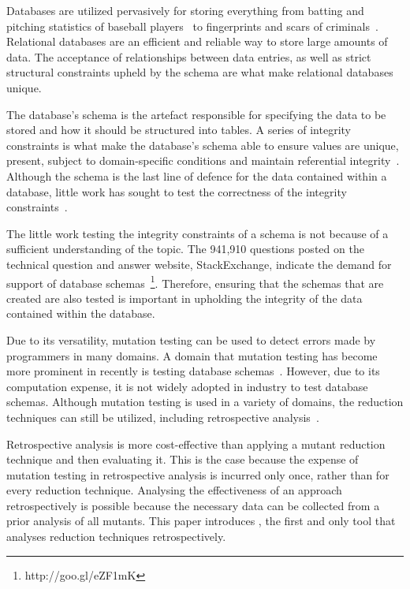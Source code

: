 Databases are utilized pervasively for storing everything from batting and pitching statistics of baseball
players~\cite{lahmanbaseball} to fingerprints and scars of criminals~\cite{ngi}.
Relational databases are an efficient and reliable way to store large amounts of data.
The acceptance of relationships between data entries, as well as strict structural constraints
upheld by the schema are what make relational databases unique.

The database's schema is the artefact responsible for specifying the data to be stored and
how it should be structured into tables. A series of integrity constraints
is what make the database's schema able to ensure values are unique, present,
subject to domain-specific conditions and maintain referential integrity~\cite{mcminn2016virtual}.
Although the schema is the last line of defence for the data contained
within a database, little work has sought to test the correctness of the integrity constraints~\cite{mcminn2015effectiveness}.




The little work testing the integrity constraints of a schema is not
because of a sufficient understanding of the topic. The 941,910 questions posted on
the technical question and answer website, StackExchange, indicate the demand for support
of database schemas~\footnote{http://goo.gl/eZF1mK}. Therefore, ensuring that
the schemas that are created are also tested is important in upholding the integrity
of the data contained within the database.

Due to its versatility, mutation testing can be used to detect errors made by programmers in many domains.
A domain that mutation testing has become more prominent in recently is testing database
schemas~\cite{mcminn2016virtual, mcminn2015effectiveness, wright2013efficient}. However,
due to its computation expense, it is not widely adopted in industry to test database schemas.
Although mutation testing is used in a variety of domains, the reduction techniques can still
be utilized, including retrospective analysis~\cite{jia2011analysis, wong1995reducing, offutt1993experimental, offutt2001mutation}.

Retrospective analysis is more cost-effective than applying a
mutant reduction technique and then evaluating it.
This is the case because the expense of mutation testing in
retrospective analysis is incurred only once, rather than for
every reduction technique. Analysing the effectiveness of an approach retrospectively
is possible because the necessary data can be collected from a prior analysis of all mutants.
This paper introduces \mr, the first and only tool that analyses reduction techniques retrospectively.

